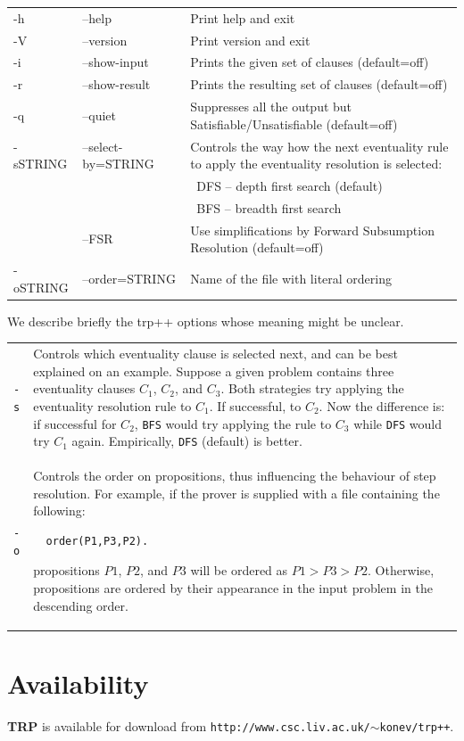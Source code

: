 \documentclass[11pt]{article}
\newcommand{\TRPpp}{\textbf{TRP\protect\raisebox{0.4ex}{\scriptsize{+}{+}}}\xspace}
\begin{document}
\begin{tabular}{llp{}}
   -h       &  --help              & Print help and exit\\
   -V       &  --version           & Print version and exit\\
   -i       &  --show-input        & Prints the given set of clauses \mbox{(default=off)}\\
   -r       &  --show-result       & Prints the resulting set of clauses
                                    (default=off)\\
   -q       &  --quiet             & Suppresses all the output but
                                    Satisfiable/Unsatisfiable \mbox{(default=off)}\\
   -sSTRING &  --select-by=STRING  & Controls the way how the next eventuality
                                    rule to apply the eventuality resolution
                                    is selected:\\
                                    & & \ DFS -- depth first search (default)\\
                                    & & \ BFS -- breadth first search\\
            &  --FSR               & Use simplifications by Forward
                                    Subsumption Resolution (default=off)\\
   -oSTRING &  --order=STRING      & Name of the file with literal ordering
\end{tabular}

\medskip

We describe briefly the trp++ options whose meaning might be unclear.

\medskip

\begin{tabular}{lp{}}
\texttt{-s} & Controls which eventuality clause is selected
  next, and can be best explained on an example. Suppose a given problem
  contains three eventuality clauses  $C_1$, $C_2$, and $C_3$. Both strategies
  try applying the eventuality resolution rule to $C_1$. If successful, to
  $C_2$.  Now the difference is: if successful for $C_2$, \texttt{BFS} would
  try applying the rule to $C_3$ while \texttt{DFS} would try $C_1$ again.  
  Empirically, \texttt{DFS} (default) is better.\\
\texttt{-o} & Controls the order on propositions, thus influencing the
  behaviour of step resolution. For example, if the prover is supplied with
  a file containing the following:
\begin{verbatim}
  order(P1,P3,P2).
\end{verbatim}
  propositions $P1$, $P2$, and $P3$ will be ordered as 
  $P1>P3>P2$. Otherwise, propositions are ordered by their appearance
  in the input problem in the descending order. 
\end{tabular}
\section{Availability}
\TRPpp is available for download from \texttt{http://www.csc.liv.ac.uk/$\sim$konev/trp++}.
\end{document}

